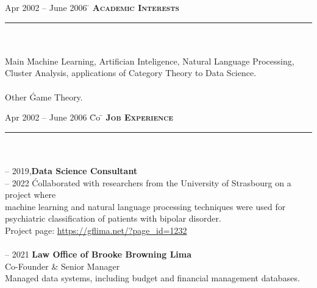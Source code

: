 \documentclass[11pt,a4paper]{article}
\begin{document}
\begin{tabbing} 
Apr 2002 -- June 2006 \=\kill
\> \textbf{\Large{\textsc{Academic Interests}}}\\
\> \noindent\rule{11cm}{1pt}\\
\\
\> Main \' Machine Learning, Artifician Inteligence, Natural Language Processing, \\ 
\> Cluster Analysis, applications of Category Theory to Data Science. \\

\\
\> Other \' Game Theory. 
\\
\end{tabbing}

\begin{tabbing}
Apr 2002 -- June 2006 \= Co \=\kill
\> \textbf{\Large{\textsc{Job Experience}}} \\
\> \noindent\rule{11cm}{1pt}\\
\> \\

 -- 2019,\' \textbf{Data Science Consultant}\\
 -- 2022 \' Collaborated with researchers from the University of Strasbourg on a project where \\  
\> machine learning and natural language processing techniques were used for \\ 
\> psychiatric classification of patients with bipolar disorder.  \\
\> Project page: \href{https://gflima.net/?page_id=1232}{\color{blue}https://gflima.net/?page\_id=1232} \\
\>
\\

 -- 2021 \' \textbf{Law Office of Brooke Browning Lima}\\
\> Co-Founder \& Senior Manager \\

\>  Managed data systems, including budget and financial management databases.\\
\\


\end{tabbing}
\end{document}
